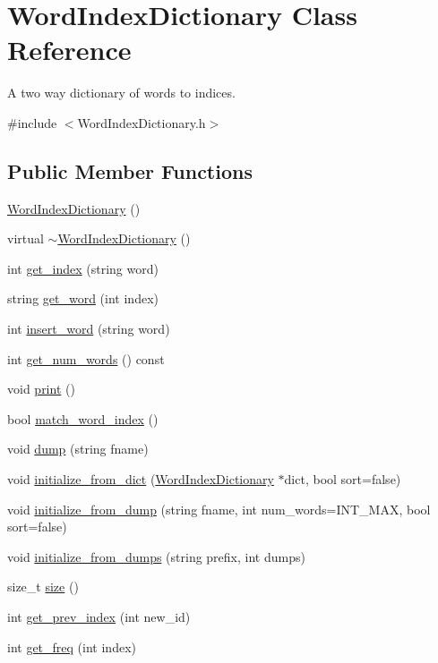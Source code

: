 \hypertarget{class_word_index_dictionary}{
\section{WordIndexDictionary Class Reference}
\label{class_word_index_dictionary}
}


A two way dictionary of words to indices.  




{\ttfamily \#include $<$WordIndexDictionary.h$>$}

\subsection*{Public Member Functions}
\begin{DoxyCompactItemize}
\item 
\hyperlink{class_word_index_dictionary_a25019e66f8c3c6e1adba40157abf69bc}{WordIndexDictionary} ()
\item 
virtual \hyperlink{class_word_index_dictionary_a6e3ee8eeacf9ace4757f4f345e519e30}{$\sim$WordIndexDictionary} ()
\item 
int \hyperlink{class_word_index_dictionary_a683dcfdc3714b73402a3e331db88e33a}{get\_\-index} (string word)
\item 
string \hyperlink{class_word_index_dictionary_a58ab80daf59d8bad6cd105166c3feb8b}{get\_\-word} (int index)
\item 
int \hyperlink{class_word_index_dictionary_a1aef628d50e42417dd1099598687c848}{insert\_\-word} (string word)
\item 
int \hyperlink{class_word_index_dictionary_aa4e879ad400d0b35a5fbfb358d3bf8e2}{get\_\-num\_\-words} () const 
\item 
void \hyperlink{class_word_index_dictionary_a4781b2b79231219cb3ecbe59e8adb483}{print} ()
\item 
bool \hyperlink{class_word_index_dictionary_aaadc560c3572f6e3006212d9b56c32b2}{match\_\-word\_\-index} ()
\item 
void \hyperlink{class_word_index_dictionary_a5263558f64f5890577e795ccd2834a5b}{dump} (string fname)
\item 
void \hyperlink{class_word_index_dictionary_a415c20e6f67555c105cdc4da3abe730f}{initialize\_\-from\_\-dict} (\hyperlink{class_word_index_dictionary}{WordIndexDictionary} $\ast$dict, bool sort=false)
\item 
void \hyperlink{class_word_index_dictionary_abbc261e4c314aace9917fcb5c5ec127f}{initialize\_\-from\_\-dump} (string fname, int num\_\-words=INT\_\-MAX, bool sort=false)
\item 
void \hyperlink{class_word_index_dictionary_a83c3a82b71ffec88dee7b58c01234de0}{initialize\_\-from\_\-dumps} (string prefix, int dumps)
\item 
size\_\-t \hyperlink{class_word_index_dictionary_ad2cc989f8d453e0353cc6de8e73d4aa0}{size} ()
\item 
int \hyperlink{class_word_index_dictionary_a834b4657d8c84ed3051c23668e2fe607}{get\_\-prev\_\-index} (int new\_\-id)
\item 
int \hyperlink{class_word_index_dictionary_af81362ed63cf02ef2722ff3087e01ac8}{get\_\-freq} (int index)
\end{DoxyCompactItemize}
